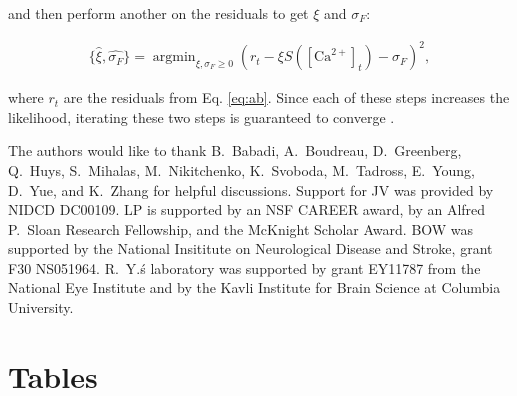 \documentclass[10pt]{article}
\DeclareMathOperator*{\argmin}{argmin}
\newcommand{\Ca}{[\text{Ca}^{2+}]}
\begin{document}
\noindent and then perform another on the residuals to get $\xi$ and $\sigma_F$:

\begin{align}
\{\widehat{\xi},\widehat{\sigma_F}\} = \argmin_{\xi, \sigma_F \geq 0} (r_t-\xi S(\Ca_t) - \sigma_F)^2,
\end{align}

\noindent where $r_t$ are the residuals from Eq. \ref{eq:ab}.  Since each of these steps increases the likelihood, iterating these two steps is guaranteed to converge  \cite{ShumwayStoffer06}.

\begin{table}[b]
\small{The authors would like to thank B.\ Babadi, A.\ Boudreau,  D.\ Greenberg, Q.\ Huys, S.\ Mihalas, M.\ Nikitchenko, K.\ Svoboda, M.\ Tadross, E.\ Young, D.\ Yue, and K.\ Zhang for helpful discussions.  Support for JV was provided by NIDCD DC00109.  LP is supported by an NSF CAREER award, by an Alfred P.\ Sloan Research Fellowship, and the McKnight Scholar Award. BOW was supported by the National Insititute on Neurological Disease and Stroke, grant F30 NS051964. R.\ Y.\'s laboratory was supported by grant EY11787 from the National Eye Institute and by the Kavli Institute for Brain Science at Columbia University.}
\end{table}

\clearpage \newpage

%


\newpage



\section*{Tables}
\end{document}
